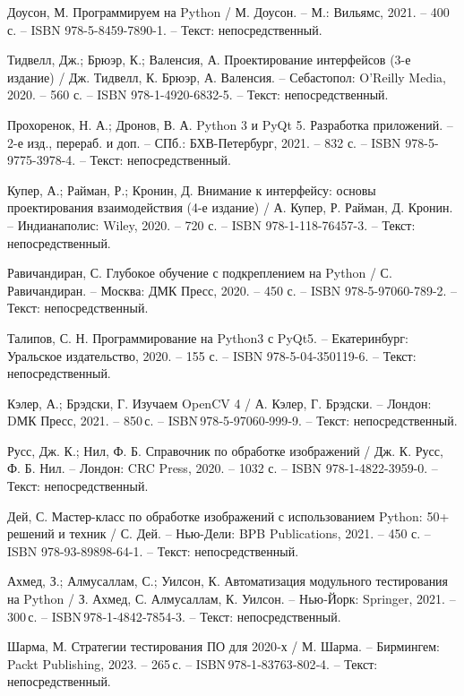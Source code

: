 \begin{thebibliography}{9}
    Доусон, М. Программируем на Python / М. Доусон. – М.: Вильямс, 2021. – 400 с. – ISBN 978-5-8459-7890-1. – Текст: непосредственный.
    
    Тидвелл, Дж.; Брюэр, К.; Валенсия, А. Проектирование интерфейсов (3-е издание) / Дж. Тидвелл, К. Брюэр, А. Валенсия. – Себастопол: O’Reilly Media, 2020. – 560 с. – ISBN 978-1-4920-6832-5. – Текст: непосредственный.
    
    Прохоренок, Н. А.; Дронов, В. А. Python 3 и PyQt 5. Разработка приложений. – 2-е изд., перераб. и доп. – СПб.: БХВ-Петербург, 2021. – 832 с. – ISBN 978-5-9775-3978-4. – Текст: непосредственный.
    
    Купер, А.; Райман, Р.; Кронин, Д. Внимание к интерфейсу: основы проектирования взаимодействия (4-е издание) / А. Купер, Р. Райман, Д. Кронин. – Индианаполис: Wiley, 2020. – 720 с. – ISBN 978-1-118-76457-3. – Текст: непосредственный.
    
    Равичандиран, С. Глубокое обучение с подкреплением на Python / С. Равичандиран. – Москва: ДМК Пресс, 2020. – 450 с. – ISBN 978-5-97060-789-2. – Текст: непосредственный.
    
    Талипов, С. Н. Программирование на Python3 с PyQt5. – Екатеринбург: Уральское издательство, 2020. – 155 с. – ISBN 978-5-04-350119-6. – Текст: непосредственный.
    
    Кэлер, А.; Брэдски, Г. Изучаем OpenCV 4 / А. Кэлер, Г. Брэдски. – Лондон: DМК Пресс, 2021. – 850 с. – ISBN 978‑5‑97060‑999‑9. – Текст: непосредственный.
    
    Русс, Дж. К.; Нил, Ф. Б. Справочник по обработке изображений / Дж. К. Русс, Ф. Б. Нил. – Лондон: CRC Press, 2020. – 1032 с. – ISBN 978-1-4822-3959-0. – Текст: непосредственный.
    
    Дей, С. Мастер-класс по обработке изображений с использованием Python: 50+ решений и техник / С. Дей. – Нью-Дели: BPB Publications, 2021. – 450 с. – ISBN 978-93-89898-64-1. – Текст: непосредственный.
    
    Ахмед, З.; Алмусаллам, С.; Уилсон, К. Автоматизация модульного тестирования на Python / З. Ахмед, С. Алмусаллам, К. Уилсон. – Нью‑Йорк: Springer, 2021. – 300 с. – ISBN 978‑1‑4842‑7854‑3. – Текст: непосредственный.
    
    Шарма, М. Стратегии тестирования ПО для 2020‑х / М. Шарма. – Бирмингем: Packt Publishing, 2023. – 265 с. – ISBN 978‑1‑83763‑802‑4. – Текст: непосредственный.
    
    
\end{thebibliography}
